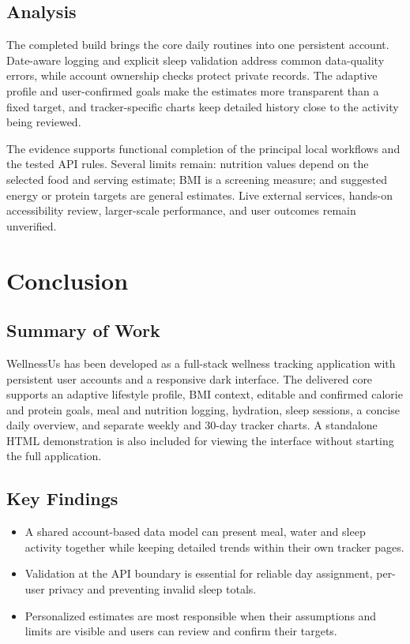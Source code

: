 \documentclass[10pt,a4paper,openany]{report}
\newcommand{\reportchapter}[1]{\chapter{#1}}
\begin{document}
\section{Analysis}
The completed build brings the core daily routines into one persistent account. Date-aware logging and explicit sleep validation address common data-quality errors, while account ownership checks protect private records. The adaptive profile and user-confirmed goals make the estimates more transparent than a fixed target, and tracker-specific charts keep detailed history close to the activity being reviewed.

The evidence supports functional completion of the principal local workflows and the tested API rules. Several limits remain: nutrition values depend on the selected food and serving estimate; BMI is a screening measure; and suggested energy or protein targets are general estimates. Live external services, hands-on accessibility review, larger-scale performance, and user outcomes remain unverified.
\clearpage

\reportchapter{Conclusion}
\section{Summary of Work}
WellnessUs has been developed as a full-stack wellness tracking application with persistent user accounts and a responsive dark interface. The delivered core supports an adaptive lifestyle profile, BMI context, editable and confirmed calorie and protein goals, meal and nutrition logging, hydration, sleep sessions, a concise daily overview, and separate weekly and 30-day tracker charts. A standalone HTML demonstration is also included for viewing the interface without starting the full application.

\section{Key Findings}
\begin{itemize}
\item A shared account-based data model can present meal, water and sleep activity together while keeping detailed trends within their own tracker pages.
\item Validation at the API boundary is essential for reliable day assignment, per-user privacy and preventing invalid sleep totals.
\item Personalized estimates are most responsible when their assumptions and limits are visible and users can review and confirm their targets.
\end{itemize}
\end{document}
